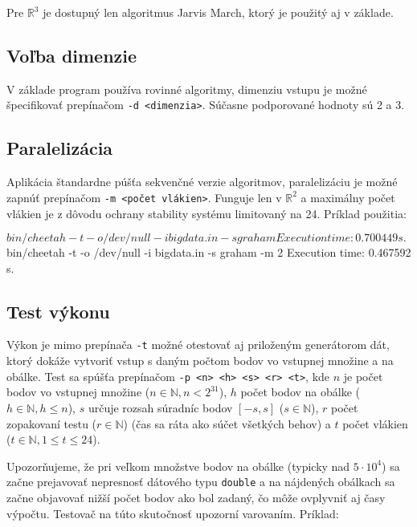 \documentclass[a4paper, 12pt, slovak]{article}
\begin{document}
Pre $\mathbb{R}^3$ je dostupný len algoritmus Jarvis March, ktorý je použitý aj v 
základe.

\subsection{Voľba dimenzie}
V základe program používa rovinné algoritmy, dimenziu vstupu je možné špecifikovať 
prepínačom \texttt{-d <dimenzia>}. Súčasne podporované hodnoty sú 2 a 3.

\subsection{Paralelizácia}
Aplikácia štandardne púšťa sekvenčné verzie algoritmov, paralelizáciu je možné 
zapnúť prepína\-čom \texttt{-m <počet vlákien>}. Funguje len v $\mathbb{R}^2$ a 
maximálny počet vlákien je z dôvodu ochrany stability systému limitovaný na 24. 
Príklad použitia:

\begin{c++}
$ bin/cheetah -t -o /dev/null -i bigdata.in -s graham
Execution time: 0.700449 s.
$ bin/cheetah -t -o /dev/null -i bigdata.in -s graham -m 2
Execution time: 0.467592 s.
\end{c++}

\subsection{Test výkonu}
Výkon je mimo prepínača \texttt{-t} možné otestovať aj priloženým generátorom dát, 
ktorý dokáže vytvoriť vstup s daným počtom bodov vo vstupnej množine a na obálke. 
Test sa spúšťa prepínačom \texttt{-p <n> <h> <s> <r> <t>}, kde $n$ je počet bodov vo 
vstupnej množine ($n \in \mathbb{N}, n < 2^{31}$), $h$ počet bodov na obálke ($h 
\in \mathbb{N}, h \leq n$), $s$ určuje rozsah súradníc bodov $[-s, s]$ ($s \in 
\mathbb{N}$), $r$ počet zopakovaní testu ($r \in \mathbb{N}$) (čas sa ráta ako súčet 
všetkých behov) a $t$ počet vlákien ($t \in \mathbb{N}, 1 \leq t \leq 24$).

Upozorňujeme, že pri veľkom množstve bodov na obálke (typicky nad $5\cdot10^4$) sa 
začne prejavovať nepresnosť dátového typu \texttt{double} a na nájdených obálkach 
sa začne objavovať nižší počet bodov ako bol zadaný, čo môže ovplyvniť aj časy 
výpočtu. Testovač na túto skutočnosť upozorní varovaním. Príklad:

\end{document}
